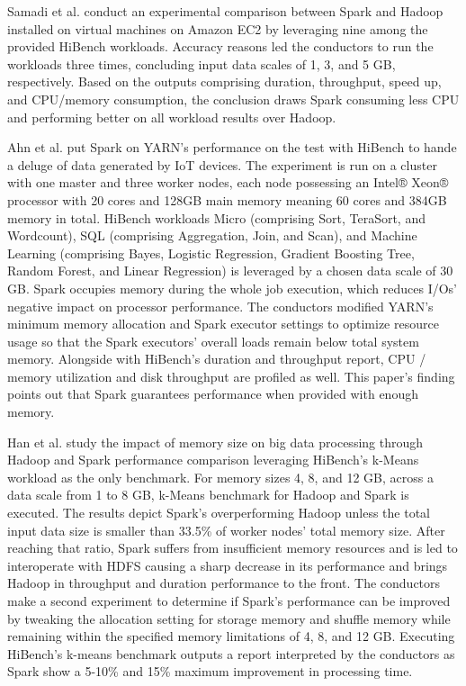 \documentclass[review]{elsarticle}
\begin{document}
Samadi et al. \cite{samadi_performance_2018} conduct an experimental comparison between Spark and Hadoop installed on virtual machines on Amazon EC2 by leveraging nine among the provided HiBench workloads. Accuracy reasons led the conductors to run the workloads three times, concluding input data scales of 1, 3, and 5 GB, respectively. Based on the outputs comprising duration, throughput, speed up, and CPU/memory consumption, the conclusion draws Spark consuming less CPU and performing better on all workload results over Hadoop. 

Ahn et al. \cite{ahn_performance_2018} put Spark on YARN's performance on the test with HiBench to hande a deluge of data generated by IoT devices. The experiment is run on a cluster with one master and three worker nodes, each node possessing an Intel® Xeon® processor with 20 cores and 128GB main memory meaning 60 cores and 384GB memory in total. HiBench workloads Micro (comprising Sort, TeraSort, and Wordcount), SQL (comprising Aggregation, Join, and Scan), and Machine Learning (comprising Bayes, Logistic Regression, Gradient Boosting Tree, Random Forest, and Linear Regression) is leveraged by a chosen data scale of 30 GB. Spark occupies memory during the whole job execution, which reduces I/Os' negative impact on processor performance. The conductors modified YARN's minimum memory allocation and Spark executor settings to optimize resource usage so that the Spark executors' overall loads remain below total system memory. Alongside with HiBench's duration and throughput report, CPU / memory utilization and disk throughput are profiled as well. This paper's finding points out that Spark guarantees performance when provided with enough memory.

Han et al. \cite{han_impact_2017} study the impact of memory size on big data processing through Hadoop and Spark performance comparison leveraging HiBench's k-Means workload as the only benchmark. For memory sizes 4, 8, and 12 GB, across a data scale from 1 to 8 GB, k-Means benchmark for Hadoop and Spark is executed. The results depict Spark's overperforming Hadoop unless the total input data size is smaller than 33.5\% of worker nodes' total memory size. After reaching that ratio, Spark suffers from insufficient memory resources and is led to interoperate with HDFS causing a sharp decrease in its performance and brings Hadoop in throughput and duration performance to the front. The conductors make a second experiment to determine if Spark's performance can be improved by tweaking the allocation setting for storage memory and shuffle memory while remaining within the specified memory limitations of 4, 8, and 12 GB. Executing HiBench's k-means benchmark outputs a report interpreted by the conductors as Spark show a 5-10\% and 15\% maximum improvement in processing time.
\end{document}
